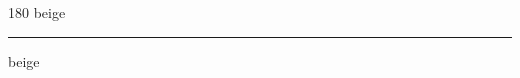 
\begin{frame}
\begin{center}
\begin{turn}{180}
{\fontsize{2.5cm}{1em}\selectfont beige}
\end{turn}
\vspace{1em}\par  
\hrule
\vspace{1em}\par  
{\fontsize{2.5cm}{1em}\selectfont beige}
\end{center}
\end{frame}
